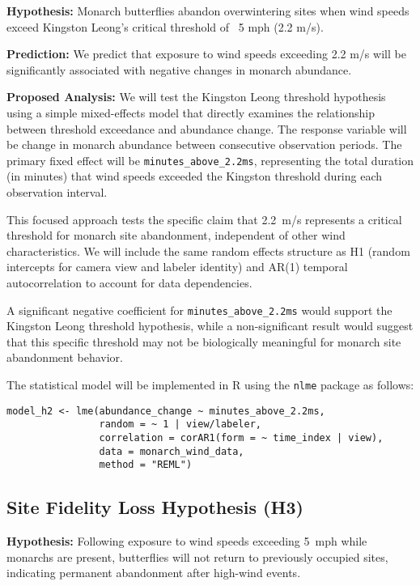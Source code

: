 \textbf{Hypothesis:} Monarch butterflies abandon overwintering sites when wind speeds exceed Kingston Leong's critical threshold of ~5 mph (2.2 m/s).

\textbf{Prediction:} We predict that exposure to wind speeds exceeding 2.2 m/s will be significantly associated with negative changes in monarch abundance.

\textbf{Proposed Analysis:}
We will test the Kingston Leong threshold hypothesis using a simple mixed-effects model that directly examines the relationship between threshold exceedance and abundance change. The response variable will be change in monarch abundance between consecutive observation periods. The primary fixed effect will be \texttt{minutes\_above\_2.2ms}, representing the total duration (in minutes) that wind speeds exceeded the Kingston threshold during each observation interval.

This focused approach tests the specific claim that 2.2~m/s represents a critical threshold for monarch site abandonment, independent of other wind characteristics. We will include the same random effects structure as H1 (random intercepts for camera view and labeler identity) and AR(1) temporal autocorrelation to account for data dependencies.

A significant negative coefficient for \texttt{minutes\_above\_2.2ms} would support the Kingston Leong threshold hypothesis, while a non-significant result would suggest that this specific threshold may not be biologically meaningful for monarch site abandonment behavior.

The statistical model will be implemented in R using the \texttt{nlme} package as follows:

\begin{verbatim}
model_h2 <- lme(abundance_change ~ minutes_above_2.2ms,
                random = ~ 1 | view/labeler,
                correlation = corAR1(form = ~ time_index | view),
                data = monarch_wind_data,
                method = "REML")
\end{verbatim}

\subsection{Site Fidelity Loss Hypothesis (H3)}

\textbf{Hypothesis:} Following exposure to wind speeds exceeding 5~mph while monarchs are present, butterflies will not return to previously occupied sites, indicating permanent abandonment after high-wind events.

